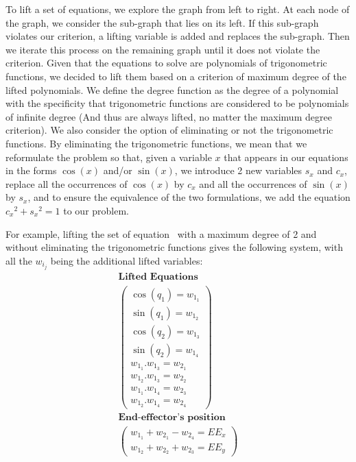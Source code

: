 To lift a set of equations, we explore the graph from left to right. At each node of the graph, we consider the sub-graph that lies on its left.
If this sub-graph violates our criterion, a lifting variable is added and replaces the sub-graph.
Then we iterate this process on the remaining graph until it does not violate the criterion.
Given that the equations to solve are polynomials of trigonometric functions, we decided to lift them based on a criterion of maximum degree of the lifted polynomials.
We define the degree function as the degree of a polynomial with the specificity that trigonometric functions are considered to be polynomials of infinite degree (And thus are always lifted, no matter the maximum degree criterion).
We also consider the option of eliminating or not the trigonometric functions.
By eliminating the trigonometric functions, we mean that we reformulate the problem so that, given a variable $x$ that appears in our equations in the forms $\cos(x)$ and/or $\sin(x)$, we introduce 2 new variables $s_x$ and $c_x$, replace all the occurrences of $\cos(x)$ by $c_x$ and all the occurrences of $\sin(x)$ by $s_x$, and to ensure the equivalence of the two formulations, we add the equation ${c_x}^2 + {s_x}^2=1$ to our problem.

For example, lifting the set of equation~ with a maximum degree of 2 and without eliminating the trigonometric functions gives the following system, with all the $w_{i_j}$ being the additional lifted variables:
\begin{equation}
  \begin{array}{c}
  \textbf{Lifted Equations}\\
  \left(
    \begin{array}{c}
      \cos(q_1) = w_{1_1}\\
      \sin(q_1) = w_{1_2}\\
      \cos(q_2) = w_{1_3}\\
      \sin(q_2) = w_{1_4}\\
      w_{1_1}.w_{1_3} = w_{2_1}\\
      w_{1_2}.w_{1_3} = w_{2_2}\\
      w_{1_1}.w_{1_4} = w_{2_3}\\
      w_{1_2}.w_{1_4} = w_{2_4}
    \end{array}
  \right)\\
  \textbf{End-effector's position}\\
  \left(\begin{array}{c}
      w_{1_1} + w_{2_1} - w_{2_4} = EE_x\\
      w_{1_2} + w_{2_2} + w_{2_3} = EE_y
    \end{array}
  \right)\\
  \end{array}
\end{equation}
\label{eq:lifted_equations}

